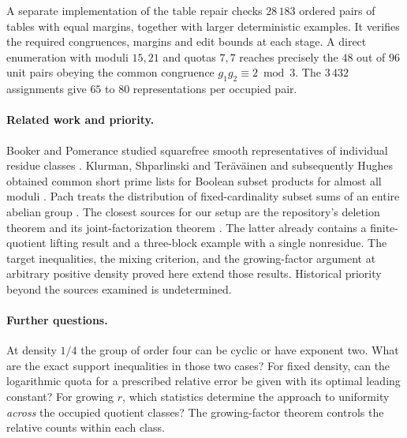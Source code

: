\documentclass[11pt,letterpaper]{article}
\begin{document}
A separate implementation of the table repair checks \(28\,183\) ordered pairs of tables with equal margins, together with larger deterministic examples. It verifies the required congruences, margins and edit bounds at each stage. A direct enumeration with moduli \(15,21\) and quotas \(7,7\) reaches precisely the \(48\) out of \(96\) unit pairs obeying the common congruence \(g_1g_2\equiv2\bmod3\). The \(3\,432\) assignments give \(65\) to \(80\) representations per occupied pair.

\paragraph{Related work and priority.}
Booker and Pomerance studied squarefree smooth representatives of individual residue classes \cite{BP}. Klurman, Shparlinski and Ter\"av\"ainen and subsequently Hughes obtained common short prime lists for Boolean subset products for almost all moduli \cite{KST,Hughes}. Pach treats the distribution of fixed-cardinality subset sums of an entire abelian group \cite{Pach}. The closest sources for our setup are the repository's deletion theorem and its joint-factorization theorem \cite{article,factor,merged}. The latter already contains a finite-quotient lifting result and a three-block example with a single nonresidue. The target inequalities, the mixing criterion, and the growing-factor argument at arbitrary positive density proved here extend those results. Historical priority beyond the sources examined is undetermined.

\paragraph{Further questions.}
At density \(1/4\) the group of order four can be cyclic or have exponent two. What are the exact support inequalities in those two cases? For fixed density, can the logarithmic quota for a prescribed relative error be given with its optimal leading constant? For growing \(r\), which statistics determine the approach to uniformity \emph{across} the occupied quotient classes? The growing-factor theorem controls the relative counts within each class.
\end{document}
